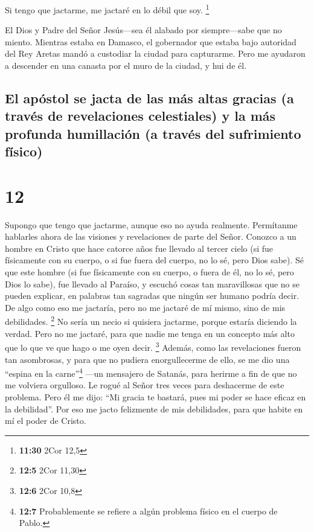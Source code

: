  Si tengo que jactarme, me jactaré en lo débil que soy.
\footnote{\textbf{11:30} 2Cor 12,5}

 El Dios y Padre del Señor Jesús---sea él alabado por
siempre---sabe que no miento.  Mientras estaba en
Damasco, el gobernador que estaba bajo autoridad del Rey Aretas mandó a
custodiar la ciudad para capturarme.  Pero me ayudaron a
descender en una canasta por el muro de la ciudad, y hui de él.

\hypertarget{el-apuxf3stol-se-jacta-de-las-muxe1s-altas-gracias-a-travuxe9s-de-revelaciones-celestiales-y-la-muxe1s-profunda-humillaciuxf3n-a-travuxe9s-del-sufrimiento-fuxedsico}{%
\subsection{El apóstol se jacta de las más altas gracias (a través de
revelaciones celestiales) y la más profunda humillación (a través del
sufrimiento
físico)}\label{el-apuxf3stol-se-jacta-de-las-muxe1s-altas-gracias-a-travuxe9s-de-revelaciones-celestiales-y-la-muxe1s-profunda-humillaciuxf3n-a-travuxe9s-del-sufrimiento-fuxedsico}}

\hypertarget{section-11}{%
\section{12}\label{section-11}}

 Supongo que tengo que jactarme, aunque eso no ayuda
realmente. Permítanme hablarles ahora de las visiones y revelaciones de
parte del Señor.  Conozco a un hombre en Cristo que hace
catorce años fue llevado al tercer cielo (si fue físicamente con su
cuerpo, o si fue fuera del cuerpo, no lo sé, pero Dios sabe).
 Sé que este hombre (si fue físicamente con su cuerpo, o
fuera de él, no lo sé, pero Dios lo sabe),  fue llevado al
Paraíso, y escuchó cosas tan maravillosas que no se pueden explicar, en
palabras tan sagradas que ningún ser humano podría decir. 
De algo como eso me jactaría, pero no me jactaré de mí mismo, sino de
mis debilidades. \footnote{\textbf{12:5} 2Cor 11,30}  No
sería un necio si quisiera jactarme, porque estaría diciendo la verdad.
Pero no me jactaré, para que nadie me tenga en un concepto más alto que
lo que ve que hago o me oyen decir. \footnote{\textbf{12:6} 2Cor 10,8}
 Además, como las revelaciones fueron tan asombrosas, y
para que no pudiera enorgullecerme de ello, se me dio una ``espina en la
carne''\footnote{\textbf{12:7} Probablemente se refiere a algún problema
  físico en el cuerpo de Pablo.} ---un mensajero de Satanás, para
herirme a fin de que no me volviera orgulloso.  Le rogué
al Señor tres veces para deshacerme de este problema. 
Pero él me dijo: ``Mi gracia te bastará, pues mi poder se hace eficaz en
la debilidad''. Por eso me jacto felizmente de mis debilidades, para que
habite en mí el poder de Cristo.

